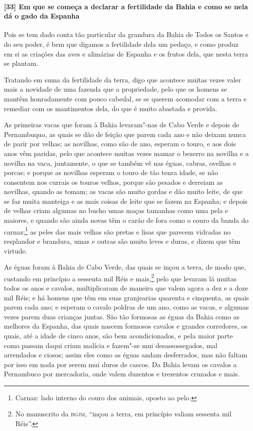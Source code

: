 \begin{linenumbers}
\paragraph{[33] Em que se começa a declarar a fertilidade da Bahia e como se nela dá o gado
da Espanha}\quad
Pois se tem dado conta tão particular da grandura da Bahia de Todos os Santos e do seu
poder, é bem que digamos a fertilidade dela um pedaço, e como produz em si as criações das
aves e alimárias de Espanha e os frutos dela, que nesta terra se plantam.

Tratando em suma da fertilidade da terra, digo que acontece muitas vezes valer mais a
novidade de uma fazenda que a propriedade, pelo que os homens se mantêm honradamente com
pouco cabedal, se se querem acomodar com a terra e remediar com os mantimentos dela, do
que é muito abastada e provida.

As primeiras vacas que foram à Bahia levaram"-nas de Cabo Verde e depois de Pernambuquo, as
quais se dão de feição que parem cada ano e não deixam nunca de parir por velhas; as
novilhas, como são de ano, esperam o touro, e aos dois anos vêm paridas, pelo que acontece
muitas vezes mamar o bezerro na novilha e a novilha na vaca, juntamente, o que se também
vê nas éguas, cabras, ovelhas e porcas; e porque as novilhas esperam o touro de tão tenra
idade, se não consentem nos currais os touros velhos, porque são pesados e derreiam as
novilhas, quando as tomam; as vacas são muito gordas e dão muito leite, de que se faz
muita manteiga e as mais coisas de leite que se fazem na Espanha; e depois de velhas criam
algumas no bucho umas maças tamanhas como uma pela e maiores, e quando são ainda novas têm
o carão de fora como o couro da banda do carnaz;\footnote{ Carnaz: lado interno do couro
dos animais, oposto ao pelo.} as peles das mais velhas são pretas e lisas que parecem
vidradas no resplandor e brandura, umas e outras são muito leves e duras, e dizem que têm
virtude.

As éguas foram à Bahia de Cabo Verde, das quais se inçou a terra, de modo que, custando em
princípio a sessenta mil Réis e mais,\footnote{ No manuscrito da \textsc{bgjm}, ``inçou a
terra, em princípio valiam sessenta mil Réis''.} pelo que levaram lá muitas todos os anos
e cavalos, multiplicaram de maneira que valem agora a dez e a doze mil Réis; e há homens
que têm em suas granjearias quarenta e cinquenta, as quais parem cada ano; e esperam o
cavalo poldras de um ano, como as vacas, e algumas vezes parem duas crianças juntas. São
tão formosas as éguas da Bahia como as melhores da Espanha, das quais nascem formosos
cavalos e grandes corredores, os quais, até a idade de cinco anos, são bem acondicionados,
e pela maior parte como passam daqui criam malícia e fazem"-se mui desassossegados, mal
arrendados e ciosos; assim eles como as éguas andam desferrados, mas não faltam por isso
em nada por serem mui duros de cascos. Da Bahia levam os cavalos a Pernambuco por
mercadoria, onde valem duzentos e trezentos cruzados e mais.


\end{linenumbers}
